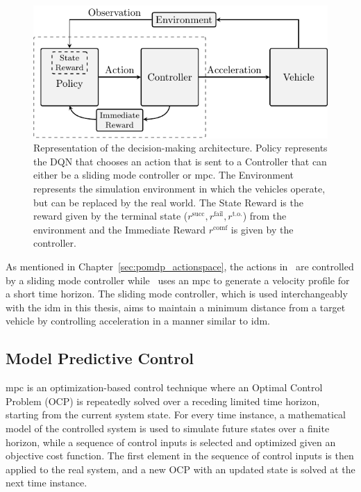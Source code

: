 \begin{figure}
	\centering
	\includegraphics[width=0.8\columnwidth]{YourThesis/papers/mpc/figures/figures-architecture.pdf}
	\caption{Representation of the decision-making architecture. Policy represents the DQN that chooses an action that is sent to a Controller that can either be a sliding mode controller or \gls{mpc}. The Environment represents the simulation environment in which the vehicles operate, but can be replaced by the real world. The State Reward is the reward given by the terminal state ($r^\mathrm{succ},r^\mathrm{fail},r^\mathrm{t.o.}$) from the environment and the Immediate Reward $r^\mathrm{comf}$ is given by the controller.}
	\label{fig:mpc_architecture}
\end{figure}

As mentioned in Chapter~\ref{sec:pomdp_actionspace}, the actions in \paperLSTM \ are controlled by a sliding mode controller while \paperMPC \ uses an \gls{mpc} to generate a velocity profile for a short time horizon. 
The sliding mode controller, which is used interchangeably with the \gls{idm} in this thesis, aims to maintain a minimum distance from a target vehicle by controlling acceleration in a manner similar to \gls{idm}. 

\subsection{Model Predictive Control}
\gls{mpc} is an optimization-based control technique where an Optimal Control Problem (OCP) is repeatedly solved over a receding limited time horizon, starting from the current system state. For every time instance, a mathematical model of the controlled system is used to simulate future states over a finite horizon, while a sequence of control inputs is selected and optimized given an objective cost function. The first element in the sequence of control inputs is then applied to the real system, and a new OCP with an updated state is solved at the next time instance.

